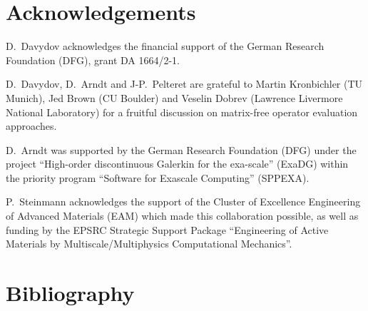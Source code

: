 \documentclass[times,doublespace]{nmeauth}
\begin{document}
\ifijnme
\acks
\else
\section*{Acknowledgements}
\fi

D.~Davydov acknowledges the financial support of the German Research Foundation (DFG), grant DA 1664/2-1.

D.~Davydov, D.~Arndt and J-P.~Pelteret are grateful to {\color{red}Martin Kronbichler (TU Munich),} Jed Brown (CU Boulder) and Veselin Dobrev (Lawrence Livermore National Laboratory) for a fruitful discussion on matrix-free operator evaluation approaches.

D.~Arndt was supported by the German Research Foundation (DFG) under the project ``High-order discontinuous
Galerkin for the exa-scale'' (\mbox{ExaDG}) within the priority program ``Software
for Exascale Computing'' (SPPEXA).


P.~Steinmann acknowledges the support of the Cluster of Excellence Engineering of Advanced Materials (EAM) which made this collaboration possible, as well as funding by the EPSRC Strategic Support Package ``Engineering of Active Materials by Multiscale/Multiphysics Computational Mechanics''.

\ifijnme

\else
\section*{Bibliography}

\fi


\end{document}
